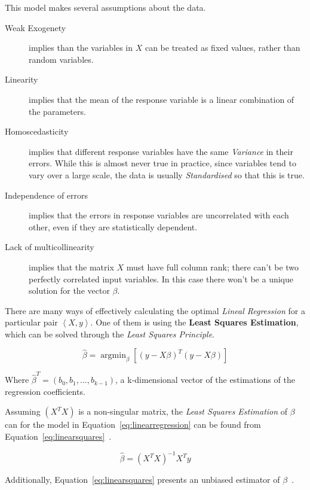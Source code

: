 This model makes several assumptions about the data.

\begin{description}
	\item[Weak Exogenety] implies than the variables in $X$ can be treated as fixed values, rather than random variables.
	\item[Linearity] implies that the mean of the response variable is a linear combination of the parameters.
	\item[Homoscedasticity] implies that different response variables have the same \emph{Variance} in their errors. While this is almost never true in practice, since variables tend to vary over a large scale, the data is usually \emph{Standardised} so that this is true.
	\item[Independence of errors] implies that the errors in response variables are uncorrelated with each other, even if they are statistically dependent.
	\item[Lack of multicollinearity] implies that the matrix $X$ must have full column rank; there can't be two perfectly correlated input variables. In this case there won't be a unique solution for the vector $\beta$.
\end{description}

There are many ways of effectively calculating the optimal \emph{Lineal Regression} for a particular pair $\left< X, y \right>$. One of them is using the \textbf{Least Squares Estimation}, which can be solved through the \emph{Least Squares Principle}.

\begin{equation}
\label{eq:leastsquaresprinciple}
	\hat{\beta} = \operatorname{argmin}_\beta \left[ {\left( y - X \beta \right)}^T \left( y - X \beta \right)\right]
\end{equation}

Where $\hat{\beta}^T = \left( b_0, b_1, \dots, b_{k - 1} \right)$, a k-dimensional vector of the estimations of the regression coefficients.

Assuming $\left( X^T X \right)$ is a non-singular matrix, the \emph{Least Squares Estimation} of $\beta$ can for the model in Equation~\ref{eq:linearregression} can be found from Equation~\ref{eq:linearsquares}~\cite{yan2009linear}.

\begin{equation}
\label{eq:linearsquares}
	\hat{\beta} = {\left( X^T X \right)}^{-1} X^T y
\end{equation}

Additionally, Equation~\ref{eq:linearsquares} presents an unbiased estimator of $\beta$~\cite{yan2009linear}.

